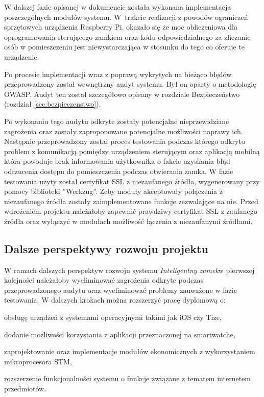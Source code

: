 \documentclass[twoside,10pt]{article}
\def\NazwaSys {\textit{Inteligentny zamek}}
\begin{document}
W dalszej fazie opisanej w dokumencie została wykonana implementacja poszczególnych modułów systemu. W~trakcie realizacji z powodów ograniczeń sprzętowych urządzenia Raspberry Pi. okazało się że moc obliczeniowa dla oprogramowania sterującego zamkiem oraz kodu odpowiedzialnego za zliczanie osób w pomieszczeniu jest niewystarczająca w stosunku do tego co oferuje te urządzenie.

Po procesie implementacji wraz z poprawą wykrytych na bieżąco błędów przeprowadzony został wewnętrzny audyt  systemu. Był on oparty o metodologię OWASP. Audyt ten został szczegółowo opisany w rozdziale Bezpieczeństwo (rozdział \ref{sec:bezpieczenstwo}).

Po wykonaniu tego audytu odkryte zostały potencjalne nieprzewidziane zagrożenia oraz zostały zaproponowane potencjalne możliwości naprawy ich. Następnie przeprowadzony został proces testowania podczas którego odkryto problem z komunikacją pomiędzy urządzeniem sterującym oraz aplikacją mobilną która powoduje brak informowania użytkownika o fakcie uzyskania błąd odrzucenia dostępu do pomieszczenia podczas otwierania zamka. W fazie testowania użyty został certyfikat SSL z niezaufanego źródła, wygenerowany przy pomocy biblioteki ''Werkzug''. Żeby moduły akceptowały połączenia z niezaufanego źródła zostały zaimplementowane funkcje zezwalające na nie. Przed wdrożeniem projektu należałoby zapewnić prawdziwy certyfikat SSL z zaufanego źródła oraz wyłączyć w modułach możliwość łączenia z niezaufanymi źródłami.               
\subsection{Dalsze perspektywy rozwoju projektu}
W ramach dalszych perspektyw rozwoju systemu \NazwaSys w pierwszej kolejności należałoby wyeliminować zagrożenia odkryte podczas przeprowadzonego audytu oraz  wyeliminować problemy zauważone w fazie testowania. 
W dalszych krokach można rozszerzyć pracę dyplomową o:
\begin{itemize*}
\item  obsługę urządzeń z systemami operacyjnymi takimi jak iOS czy Tize,
\item dodanie możliwości korzystania z aplikacji przeznaczonej na smartwatche, 
\item zaprojektowanie oraz implementacje modułów ekonomicznych z wykorzystaniem mikroprocesora STM,
\item rozszerzenie funkcjonalności systemu o funkcje związane z tematem internetem przedmiotów.

\end{itemize*}
\end{document}

